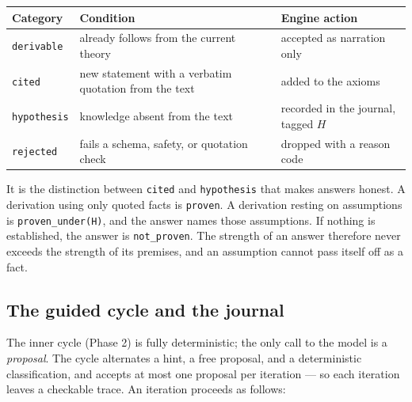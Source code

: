 \documentclass[11pt,a4paper]{article}
\begin{document}
\begin{center}
\begin{tabular}{p{2.4cm}p{6.2cm}p{4.6cm}}
\toprule
\textbf{Category} & \textbf{Condition} & \textbf{Engine action} \\
\midrule
\texttt{derivable} & already follows from the current theory & accepted as narration only \\
\texttt{cited} & new statement with a verbatim quotation from the text & added to the axioms \\
\texttt{hypothesis} & knowledge absent from the text & recorded in the journal, tagged $H$ \\
\texttt{rejected} & fails a schema, safety, or quotation check & dropped with a reason code \\
\bottomrule
\end{tabular}
\end{center}

It is the distinction between \texttt{cited} and \texttt{hypothesis} that makes answers
honest. A derivation using only quoted facts is \texttt{proven}. A derivation resting on
assumptions is \texttt{proven\_under(H)}, and the answer names those assumptions. If nothing
is established, the answer is \texttt{not\_proven}. The strength of an answer therefore
never exceeds the strength of its premises, and an assumption cannot pass itself off as a
fact.

\subsection{The guided cycle and the journal}
\label{sec:cycle}

The inner cycle (Phase 2) is fully deterministic; the only call to the model is a
\emph{proposal}. The cycle alternates a hint, a free proposal, and a deterministic
classification, and accepts at most one proposal per iteration --- so each iteration leaves
a checkable trace. An iteration proceeds as follows:
\end{document}
